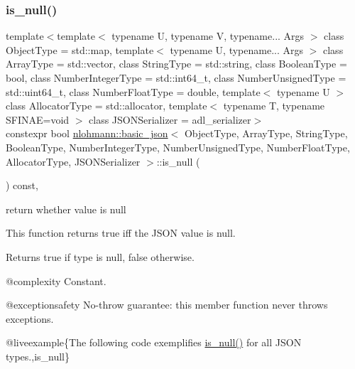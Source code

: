 \subsubsection{\texorpdfstring{is\_null()}{is\_null()}}
{\footnotesize\ttfamily template$<$template$<$ typename U, typename V, typename... Args $>$ class Object\+Type = std\+::map, template$<$ typename U, typename... Args $>$ class Array\+Type = std\+::vector, class String\+Type  = std\+::string, class Boolean\+Type  = bool, class Number\+Integer\+Type  = std\+::int64\+\_\+t, class Number\+Unsigned\+Type  = std\+::uint64\+\_\+t, class Number\+Float\+Type  = double, template$<$ typename U $>$ class Allocator\+Type = std\+::allocator, template$<$ typename T, typename S\+F\+I\+N\+A\+E=void $>$ class J\+S\+O\+N\+Serializer = adl\+\_\+serializer$>$ \\
constexpr bool \mbox{\hyperlink{classnlohmann_1_1basic__json}{nlohmann\+::basic\+\_\+json}}$<$ Object\+Type, Array\+Type, String\+Type, Boolean\+Type, Number\+Integer\+Type, Number\+Unsigned\+Type, Number\+Float\+Type, Allocator\+Type, J\+S\+O\+N\+Serializer $>$\+::is\+\_\+null (\begin{DoxyParamCaption}{ }\end{DoxyParamCaption}) const\hspace{0.3cm}{\ttfamily [inline]}, {\ttfamily [noexcept]}}



return whether value is null 

This function returns true iff the J\+S\+ON value is null.

\begin{DoxyReturn}{Returns}
{\ttfamily true} if type is null, {\ttfamily false} otherwise.
\end{DoxyReturn}
@complexity Constant.

@exceptionsafety No-\/throw guarantee\+: this member function never throws exceptions.

@liveexample\{The following code exemplifies {\ttfamily \mbox{\hyperlink{classnlohmann_1_1basic__json_a8faa039ca82427ed29c486ffd00600c3}{is\+\_\+null()}}} for all J\+S\+ON types.,is\+\_\+null\}

